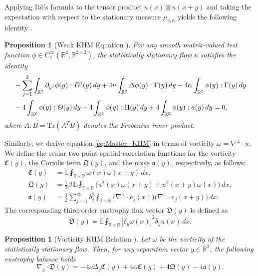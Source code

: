 \documentclass[11pt,a4paper]{article}
\numberwithin{equation}{section}
\newtheorem{proposition}[theorem]{Proposition}%
\numberwithin{theorem}{section}
\numberwithin{remark}{section}
\numberwithin{definition}{section}
\begin{document}
Applying Itô's formula to the tensor product $u(x) \otimes u(x+y)$ and taking the expectation with respect to the stationary measure $\mu_{\nu,\alpha}$ yields the following identity \cite[eq. (3.19)]{YuriAmiraliGigliola}.

\begin{proposition}[Weak KHM Equation \cite{YuriAmiraliGigliola}] \label{prop:weak_KHM}
For any smooth matrix-valued test function $\phi \in C_c^\infty(\mathbb{R}^2, \mathbb{R}^{2\times 2})$, the statistically stationary flow $u$ satisfies the identity
\begin{align}\label{eq:Master_KHM}
    &-\sum_{j=1}^2 \int_{\mathbb{R}^2} \partial_{y^j} \phi(y) : D^j(y) \, dy + 4\nu \int_{\mathbb{R}^2} \Delta \phi(y) : \Gamma(y) \, dy - 4\alpha \int_{\mathbb{R}^2} \phi(y) : \Gamma(y) \, dy \notag \\
    &- 4\int_{\mathbb{R}^2} \phi(y) : \varTheta(y) \, dy - 4\int_{\mathbb{R}^2} \phi(y) : \Pi(y) \, dy + 4\int_{\mathbb{R}^2} \phi(y) : a(y) \, dy = 0,
\end{align}
where $A : B = \text{Tr}(A^T B)$ denotes the Frobenius inner product.
\end{proposition}
Similarly, we derive equation \eqref{eq:Master_KHM} in terms of vorticity $\omega = \nabla^\perp \cdot u$. 
We define the scalar two-point spatial correlation functions for the vorticity $\mathfrak{C}(y)$, the Coriolis term $\mathfrak{Q}(y)$, and the noise $\mathfrak{a}(y)$, respectively, as follows:
\begin{align}
    \mathfrak{C}(y) &= \mathbb{E}\fint_{\mathbb{T}\times \mathbb{R}} \omega(x)\omega(x+y) \, dx, \label{def:vorticity_corr}\\
    \mathfrak{Q}(y) &= \frac{1}{2}\beta \, \mathbb{E}\fint_{\mathbb{T}\times \mathbb{R}} \big( u^2(x)\omega(x+y) + u^2(x+y)\omega(x) \big) \, dx, \label{def:coriolis_vort_corr}\\
    \mathfrak{a}(y) &= \frac{1}{2}\sum_{j=1}^\infty b_j^2\fint_{\mathbb{T}\times \mathbb{R}} \big(\nabla^\perp \cdot e_j(x)\big)\big(\nabla^\perp \cdot e_j(x+y)\big) \, dx. \label{def:noise_curl_corr}
\end{align}
The corresponding third-order enstrophy flux vector $\mathfrak{D}(y)$ is defined as
\begin{equation}\label{def:D_vorticity}
    \mathfrak{D}(y) = \mathbb{E}\fint_{\mathbb{T}\times \mathbb{R}} |\delta_y\omega(x)|^2\delta_y u(x) \, dx.
\end{equation}

\begin{proposition}[Vorticity KHM Relation \cite{YuriAmiraliGigliola}]\label{prop:vorticity_KHM}
Let $\omega$ be the vorticity of the statistically stationary flow. Then, for any separation vector $y \in \mathbb{R}^2$, the following enstrophy balance holds 
\begin{equation}\label{eq:vorticity_khm}
    \nabla_y \cdot \mathfrak{D}(y) = -4\nu\Delta_y\mathfrak{C}(y) + 4\alpha\mathfrak{C}(y) + 4\mathfrak{Q}(y) - 4\mathfrak{a}(y).
\end{equation}
\end{proposition}
\end{document}
